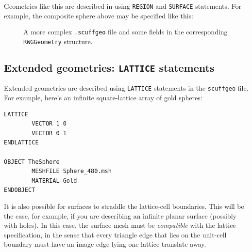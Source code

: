 \documentclass[letterpaper]{article}
\begin{document}
Geometries like this are described in \lss
using \texttt{REGION} and \texttt{SURFACE}
statements. For example, the composite sphere
above may be specified like this:
\begin{figure}[H]
\begin{center}
\caption{A more complex \texttt{.scuffgeo} file and some fields in the 
         corresponding \texttt{RWGGeometry} structure.}
\end{center}
\end{figure}
\subsection*{Extended geometries: \texttt{LATTICE}
             statements}

Extended geometries are described using \texttt{LATTICE}
statements in the \texttt{scuffgeo} file.
For example, here's an infinite square-lattice array 
of gold spheres:
%
\begin{verbatim}
LATTICE
        VECTOR 1 0 
        VECTOR 0 1 
ENDLATTICE

OBJECT TheSphere
        MESHFILE Sphere_480.msh
        MATERIAL Gold
ENDOBJECT
\end{verbatim}
%

It is also possible for surfaces to straddle 
the lattice-cell boundaries. This will be the 
case, for example, if you are describing an
infinite planar surface (possibly with
holes). In this case, the surface mesh must
be \textit{compatible} with the lattice specification,
in the sense that every triangle edge that 
lies on the unit-cell boundary must have an
image edge lying one lattice-translate away.
\end{document}
